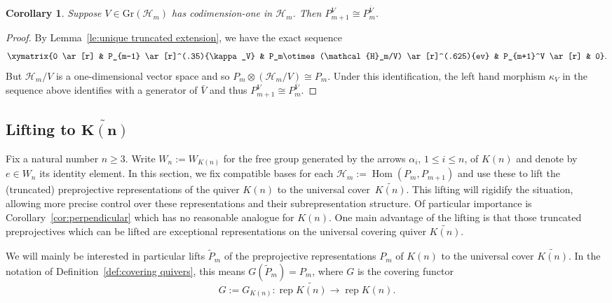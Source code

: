 \documentclass{amsart}
\newtheorem{corollary}[theorem]{Corollary}
\numberwithin{equation}{section}
\newcommand{\cH}{\mathcal{H}}
\newcommand{\Gr}{\mathrm{Gr}}
\newcommand{\Hom}{\operatorname{Hom}}
\newcommand{\rep}{\operatorname{rep}}
\begin{document}
\begin{corollary}
  \label{cor:truncated preprojective isomorphism}
  Suppose $V\in \Gr(\cH_m)$ has codimension-one in $\cH_m$.  Then $P_{m+1}^V\cong P_m^{\bar{V}}$.
\end{corollary}
\begin{proof}
  By Lemma~\ref{le:unique truncated extension}, we have the exact sequence
  \[\xymatrix{0 \ar[r] & P_{m-1} \ar[r]^(.35){\kappa_V} & P_m\otimes(\cH_m/V) \ar[r]^(.625){ev} & P_{m+1}^V \ar[r] & 0}.\]
  But $\cH_m/V$ is a one-dimensional vector space and so $P_m\otimes(\cH_m/V)\cong P_m$.
  Under this identification, the left hand morphism $\kappa_V$ in the sequence above identifies with a generator of $\bar{V}$ and thus $P_{m+1}^V\cong P_m^{\bar{V}}$.
\end{proof}

               


\subsection{Lifting to \texorpdfstring{$\mathbf{\widetilde{K(n)}}$}{K(n)}}
\label{Lifting}

Fix a natural number $n\geq 3$.
Write $W_n:=W_{K(n)}$ for the free group generated by the arrows $\alpha_i$, $1\le i\le n$, of $K(n)$ and denote by $e\in W_n$ its identity element.
In this section, we fix compatible bases for each $\cH_m:=\Hom(P_m,P_{m+1})$ and use these to lift the (truncated) preprojective representations of the quiver $K(n)$ to the universal cover~$\widetilde{K(n)}$.
This lifting will rigidify the situation, allowing more precise control over these representations and their subrepresentation structure.
Of particular importance is Corollary~\ref{cor:perpendicular} which has no reasonable analogue for $K(n)$.
One main advantage of the lifting is that those truncated preprojectives which can be lifted are exceptional representations on the universal covering quiver $\widetilde{K(n)}$.

We will mainly be interested in particular lifts $\tilde P_m$ of the preprojective representations $P_m$ of $K(n)$ to the universal cover $\widetilde{K(n)}$.
In the notation of Definition~\ref{def:covering quivers}, this means $G(\tilde P_m)=P_m$, where $G$ is the covering functor 
\[G:=G_{K(n)}:\rep\widetilde{K(n)}\to\rep K(n).\]
\end{document}
